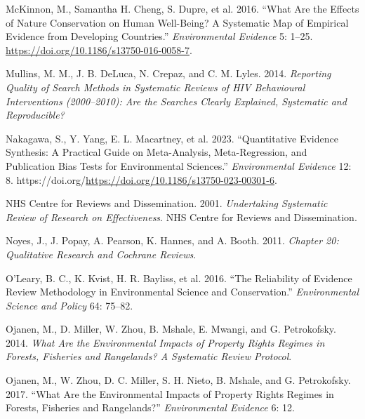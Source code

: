 \documentclass[
  letterpaper,
  DIV=11,
  numbers=noendperiod]{scrreprt}
\newlength{\cslhangindent}
\newenvironment{CSLReferences}[2] %
 {\begin{list}{}{%
  \setlength{\itemindent}{0pt}
  \setlength{\leftmargin}{0pt}
  \setlength{\parsep}{0pt}
  \ifodd #1
   \setlength{\leftmargin}{\cslhangindent}
   \setlength{\itemindent}{-1\cslhangindent}
  \fi
  \setlength{\itemsep}{#2\baselineskip}}}
 {\end{list}}
\begin{document}
\begin{CSLReferences}{1}{1}
McKinnon, M., Samantha H. Cheng, S. Dupre, et al. 2016. {``What Are the
Effects of Nature Conservation on Human Well-Being? A Systematic Map of
Empirical Evidence from Developing Countries.''} \emph{Environmental
Evidence} 5: 1--25. \url{https://doi.org/10.1186/s13750-016-0058-7}.

Mullins, M. M., J. B. DeLuca, N. Crepaz, and C. M. Lyles. 2014.
\emph{Reporting Quality of Search Methods in Systematic Reviews of HIV
Behavioural Interventions (2000--2010): Are the Searches Clearly
Explained, Systematic and Reproducible?}

{Nakagawa, S., Y. Yang, E. L. Macartney, et al.} 2023. {``Quantitative
Evidence Synthesis: A Practical Guide on Meta-Analysis, Meta-Regression,
and Publication Bias Tests for Environmental Sciences.''}
\emph{Environmental Evidence} 12: 8.
https://doi.org/\url{https://doi.org/10.1186/s13750-023-00301-6}.

NHS Centre for Reviews and Dissemination. 2001. \emph{Undertaking
Systematic Review of Research on Effectiveness}. {NHS Centre for Reviews
and Dissemination}.

Noyes, J., J. Popay, A. Pearson, K. Hannes, and A. Booth. 2011.
\emph{Chapter 20: Qualitative Research and Cochrane Reviews}.

O'Leary, B. C., K. Kvist, H. R. Bayliss, et al. 2016. {``The Reliability
of Evidence Review Methodology in Environmental Science and
Conservation.''} \emph{Environmental Science and Policy} 64: 75--82.

Ojanen, M., D. Miller, W. Zhou, B. Mshale, E. Mwangi, and G.
Petrokofsky. 2014. \emph{What Are the Environmental Impacts of Property
Rights Regimes in Forests, Fisheries and Rangelands? A Systematic Review
Protocol}.

Ojanen, M., W. Zhou, D. C. Miller, S. H. Nieto, B. Mshale, and G.
Petrokofsky. 2017. {``What Are the Environmental Impacts of Property
Rights Regimes in Forests, Fisheries and Rangelands?''}
\emph{Environmental Evidence} 6: 12.


\end{CSLReferences}
\end{document}
